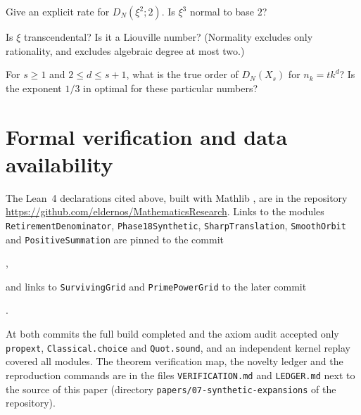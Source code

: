 \documentclass[11pt]{article}
\newcommand{\ttt}[1]{\texttt{#1}}
\begin{document}
\begin{question}
Give an explicit rate for $D_N(\xi^2;2)$. Is $\xi^3$ normal to base $2$?
\end{question}

\begin{question}
Is $\xi$ transcendental? Is it a Liouville number? (Normality excludes only rationality, and
 excludes algebraic degree at most two.)
\end{question}

\begin{question}
For $s\ge1$ and $2\le d\le s+1$, what is the true order of $D_N(X_s)$ for $n_k=tk^d$? Is the exponent
$1/3$ in  optimal for these particular numbers?
\end{question}

\section{Formal verification and data availability}\label{sec:formal}

The Lean~4 \cite{Lean4} declarations cited above, built with Mathlib \cite{Mathlib}, are in the
repository \url{https://github.com/eldernos/MathematicsResearch}. Links to the modules
\ttt{RetirementDenominator}, \ttt{Phase18Synthetic}, \ttt{SharpTranslation}, \ttt{SmoothOrbit} and
\ttt{PositiveSummation} are pinned to the commit
\begin{center}\ttt{\leancommit},\end{center}
and links to \ttt{SurvivingGrid} and \ttt{PrimePowerGrid} to the later commit
\begin{center}\ttt{\phaseXIXcommit}.\end{center}
At both commits the full build completed and the axiom audit accepted only \ttt{propext},
\ttt{Classical.choice} and \ttt{Quot.sound}, and an independent kernel replay covered all modules. The
theorem verification map, the novelty ledger and the reproduction commands are in the files
\ttt{VERIFICATION.md} and \ttt{LEDGER.md} next to the source of this paper (directory
\ttt{papers/07-synthetic-expansions} of the repository).
\end{document}
